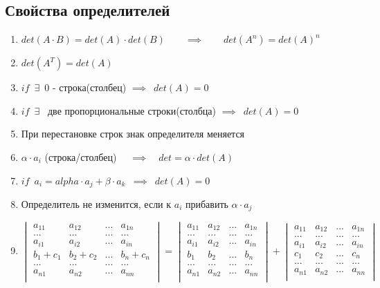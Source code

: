 \documentclass[12pt]{article}
\begin{document}
	\subsection{Свойства определителей}
	\begin{enumerate}
		\item $det(A \cdot B) = det(A) \cdot det(B) \qquad \implies \qquad det(A^n)=det(A)^n$
		\item $det(A^T) = det(A)$
		\item $if \enspace \exists \enspace 0$ - строка(столбец) $\implies \enspace det(A) = 0$
		\item $if \enspace \exists \enspace $ две пропорциональные строки(столбца) $\implies \enspace det(A) = 0$
		\item При перестановке строк знак определителя меняется
		\item $\alpha \cdot a_{i}$ (строка/столбец) $\quad \implies \quad det = \alpha \cdot det(A)$
		\item $if \enspace a_i=alpha \cdot a_j + \beta \cdot a_k \enspace \implies \enspace det(A) = 0$
		\item Определитель не изменится, если к $a_i$ прибавить $\alpha \cdot a_j$ \\
		\item $\begin{vmatrix}
		a_{11} & a_{12} & ... & a_{1n} \\
		... & ... & ... & ...\\
		a_{i1} & a_{i2} & ... & a_{in} \\
		b_1+c_1 & b_2+c_2 & ... & b_n + c_n\\
		... & ... & ... & ...\\
		a_{n1} & a_{n2} & ... & a_{nn} \\
	\end{vmatrix} = 
	\begin{vmatrix}
		a_{11} & a_{12} & ... & a_{1n} \\
		... & ... & ... & ...\\
		a_{i1} & a_{i2} & ... & a_{in} \\
		b_1 & b_2 & ... & b_n\\
		... & ... & ... & ...\\
		a_{n1} & a_{n2} & ... & a_{nn} \\
	\end{vmatrix} + 
	\begin{vmatrix}
		a_{11} & a_{12} & ... & a_{1n} \\
		... & ... & ... & ...\\
		a_{i1} & a_{i2} & ... & a_{in} \\
		c_1 & c_2 & ... & c_n\\
		... & ... & ... & ...\\
		a_{n1} & a_{n2} & ... & a_{nn} \\
	\end{vmatrix}$
	\end{enumerate}
\vspace{.5cm}
\end{document}
